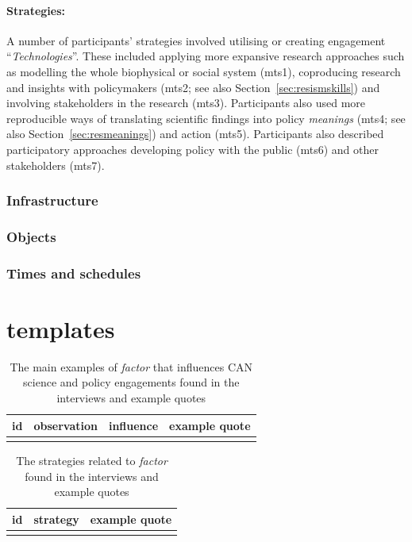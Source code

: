 \paragraph{Strategies:} A number of participants' strategies involved utilising or creating engagement ``\emph{Technologies}''. These included applying more expansive research approaches such as modelling the whole biophysical or social system (mts1), coproducing research and insights with policymakers (mts2; see also Section~\ref{sec:resismskills}) and involving stakeholders in the research (mts3). Participants also used more reproducible ways of translating scientific findings into policy \emph{meanings} (mts4; see also Section~\ref{sec:resmeanings}) and action (mts5). Participants also described participatory approaches developing policy with the public (mts6) and other stakeholders (mts7).


\subsubsection{Infrastructure}\label{sec:resinfrastructure}
\subsubsection{Objects}\label{sec:resobjects}
\subsubsection{Times and schedules}\label{sec:restimes}

\section{templates}

\begin{table}[!ht]
\footnotesize
\caption{The main examples of \emph{factor} that influences CAN science and policy  engagements found in the interviews and example quotes}\label{tab:res****}
\begin{tabular}{L{.06\linewidth}L{.3\linewidth}L{.12\linewidth}L{.52\linewidth}} \hline
\textbf{id} & \textbf{observation} & \textbf{influence} & \textbf{example quote} \\ \hline \hline 
 &  &  &  \\[5mm] 
 \hline
\end{tabular}
\end{table}

\begin{table}[!ht]
\footnotesize
\caption{The strategies related to \emph{factor} found in the interviews and example quotes}\label{tab:res****strat}
\begin{tabular}{L{.06\linewidth}L{.3\linewidth}L{.64\linewidth}} \hline
\textbf{id} & \textbf{strategy} & \textbf{example quote} \\ \hline \hline
 &  & \\[5mm] 
 \hline
 \end{tabular}
\end{table}

